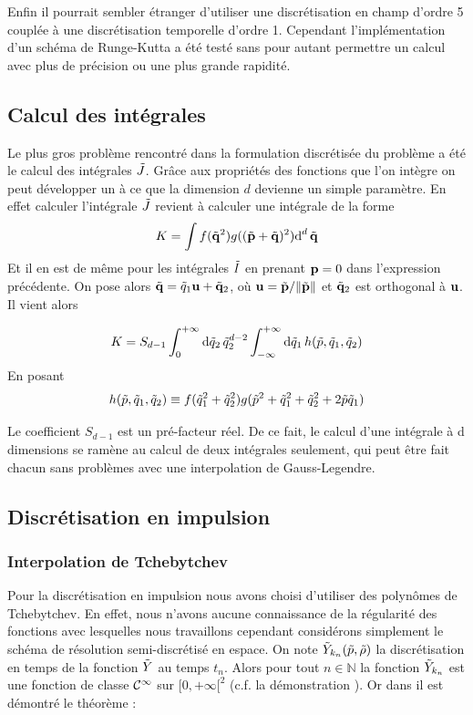 \documentclass[10pt]{article}
\begin{document}
\begin{multicols}{2}
Enfin il pourrait sembler étranger d'utiliser une discrétisation en champ d'ordre 5 couplée à une discrétisation temporelle d'ordre 1. Cependant l'implémentation d'un schéma de Runge-Kutta a été testé sans pour autant permettre un calcul avec plus de précision ou une plus grande rapidité. 

\subsection{Calcul des intégrales}

Le plus gros problème rencontré dans la formulation discrétisée du problème a été le calcul des intégrales $\tilde{J}$. 
Grâce aux propriétés des fonctions que l'on intègre on peut développer un à ce que la dimension $d$ devienne un simple paramètre. En effet calculer l'intégrale $\tilde{J}$ revient à calculer une intégrale de la forme 
\begin{equation}
K = \int f(\tilde{{\bf q}}^2)g((\tilde{{\bf p}}+\tilde{{\bf q}})^2)\text{d}^d \, \tilde{{\bf q}}
\end{equation}
Et il en est de même pour les intégrales $\tilde{I}$ en prenant ${\bf p} = 0$ dans l'expression précédente. On pose alors $\tilde{{\bf q}} = \tilde{q}_1 {\bf u} + \tilde{{\bf q}}_2$, où ${\bf u} = \tilde{{\bf p}}/\|\tilde{{\bf p}}\|$ et $\tilde{{\bf q}}_2$ est orthogonal à ${\bf u}$. Il vient alors

\begin{equation}
K = S_{d-1} \int_0^{+\infty} \text{d}\tilde{q}_2 \, \tilde{q}_2^{d-2} \int_{-\infty}^{+\infty} \text{d}\tilde{q}_1 \, h (\tilde{p}, \tilde{q}_1, \tilde{q}_2)
\end{equation}
En posant
\begin{equation}
h (\tilde{p}, \tilde{q}_1, \tilde{q}_2) \equiv f(\tilde{q}_1^2 + \tilde{q}_2^2) g(\tilde{p}^2 + \tilde{q}_1^2 + \tilde{q}_2^2 + 2\tilde{p}\tilde{q}_1)
\end{equation}

Le coefficient $S_{d-1}$ est un pré-facteur réel. De ce fait, le calcul d'une intégrale à d dimensions se ramène au calcul de deux intégrales seulement, qui peut être fait chacun sans problèmes avec une interpolation de Gauss-Legendre.


\subsection{Discrétisation en impulsion}
\subsubsection{Interpolation de Tchebytchev}

Pour la discrétisation en impulsion nous avons choisi d'utiliser des polynômes de Tchebytchev. En effet, nous n'avons aucune connaissance de la régularité des fonctions avec lesquelles nous travaillons cependant considérons simplement le schéma de résolution semi-discrétisé en espace. On note $\tilde{Y}_{k_n}(\tilde{p}, \tilde{\rho})$ la discrétisation en temps de la fonction $\tilde{Y}$ au temps $t_n$. Alors pour tout $n \in \mathbb{N}$ la fonction $\tilde{Y}_{k_n}$ est une fonction de classe $\mathcal{C}^{\infty}$ sur $[0, +\infty[^2$ (c.f. la démonstration ). Or dans \cite{Tchebychev} il est démontré le théorème : \\


\end{multicols}
\end{document}
